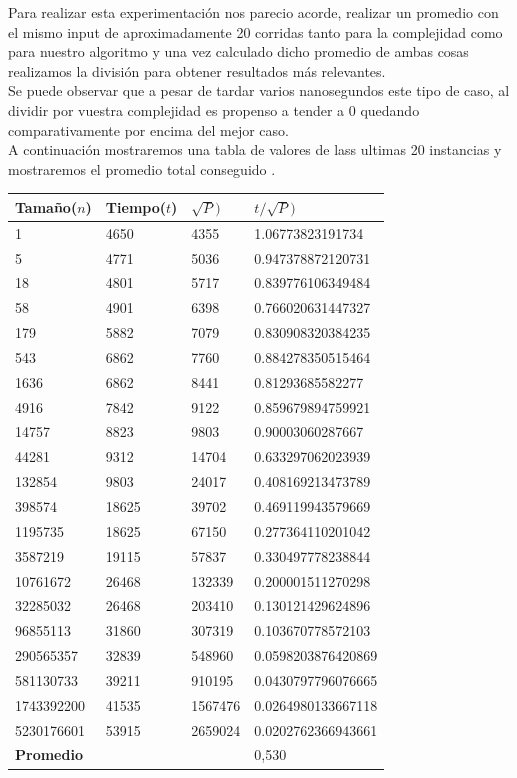 Para realizar esta experimentaci\'on nos parecio acorde, realizar un promedio con el mismo input de aproximadamente 20 corridas
tanto para la complejidad como para nuestro algoritmo y una vez calculado dicho promedio de ambas cosas realizamos la divisi\'on para
obtener resultados m\'as relevantes.\\ 

Se puede observar que a pesar de tardar varios nanosegundos este tipo de caso, al dividir por vuestra complejidad
es propenso a tender a 0 quedando comparativamente por encima del mejor caso.\\

A continuaci\'on mostraremos una tabla de valores de lass ultimas 20 instancias y
mostraremos el promedio total conseguido .\\


\begin{table}[H]

    \begin{tabular}{ | l | l |l |l |}
    \hline
	Tamaño($n$) & Tiempo($t$) & \textbf{$\sqrt{P})$} & \textbf{$t/\sqrt{P})$}  \\ \hline
1 & 4650	 & 4355 &	1.06773823191734 \\ \hline
5 &	4771	 & 5036	& 0.947378872120731\\ \hline
18 &	4801	 & 5717	& 0.839776106349484\\ \hline
58 &	4901	 & 6398	& 0.766020631447327\\ \hline
179 &	5882	 & 7079	& 0.830908320384235\\ \hline
543	& 6862	&7760 &	0.884278350515464\\ \hline
1636&	6862 &	8441 &	0.81293685582277\\ \hline
4916&	7842	 & 9122 & 	 0.859679894759921\\ \hline
14757 &	8823	 & 9803 &	0.90003060287667\\ \hline
44281 &	9312	 & 14704 &	0.633297062023939\\ \hline
132854 &	 9803	 & 24017 &	0.408169213473789\\ \hline
398574 &	 18625 & 	39702 &	0.469119943579669\\ \hline
1195735 &	18625 &	67150 &	0.277364110201042\\ \hline
3587219	& 19115	& 57837&	 0.330497778238844\\ \hline
10761672 	& 26468 &	132339 & 	0.200001511270298\\ \hline
32285032	 &26468& 	 203410	& 0.130121429624896\\ \hline
96855113 & 	31860 &	307319 & 	0.103670778572103\\ \hline
290565357 &	32839 &	548960 &	 0.0598203876420869\\ \hline
581130733 & 	39211 &	910195 &	 0.0430797796076665\\ \hline
1743392200 &	41535 &	1567476 &	0.0264980133667118\\ \hline
5230176601 &	53915 &	2659024	&0.0202762366943661\\ \hline

    \textbf{Promedio} & & & 0,530 \\ \hline
    \end{tabular}
\end{table}

